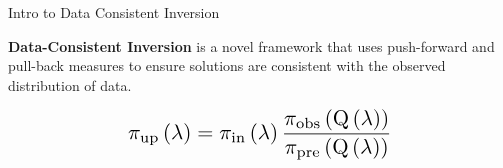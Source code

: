\begin{block}{Intro to Data Consistent Inversion}
\centering

             {\large \textbf{Data-Consistent Inversion} is a novel framework that uses push-forward and pull-back measures to ensure solutions are consistent with the observed distribution of data.}

\vspace{0.5cm}
\[ \scalebox{1.5}{$\dci$} \]


\end{block}


